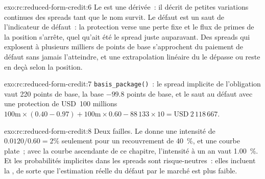 \begin{solution}{exo:rc:reduced-form-credit:6}
Le  est une dérivée~: il décrit de petites variations continues des spreads tant que le nom
survit. Le défaut est un saut de l'indicateur de défaut~: la protection verse une perte fixe et
le flux de primes de la position s'arrête, quel qu'ait été le spread juste auparavant. Des spreads
qui explosent à plusieurs milliers de points de base s'approchent du paiement de défaut sans jamais
l'atteindre, et une extrapolation linéaire du  le dépasse ou reste en deçà selon la position.
\end{solution}

\begin{solution}{exo:rc:reduced-form-credit:7}
\texttt{basis\_package()}~: le spread implicite de l'obligation vaut 220 points de base, la base
$-99.8$ points de base, et le saut au défaut avec une protection de USD~100 millions
$100\text{m}\times(0.40-0.97)+100\text{m}\times0.60-88\,133\times10 = \text{USD}~2\,118\,667$.
\end{solution}

\begin{solution}{exo:rc:reduced-form-credit:8}
Deux failles. Le  donne une intensité de $0.0120/0.60 = 2\%$ seulement pour un
recouvrement de 40~\%, et une courbe plate~; avec la courbe ascendante de ce chapitre,
l'intensité à un an vaut 1.00~\%. Et les probabilités implicites dans les spreads sont risque-neutres~:
elles incluent la , de sorte que l'estimation réelle du défaut par le marché est plus faible.
\end{solution}

